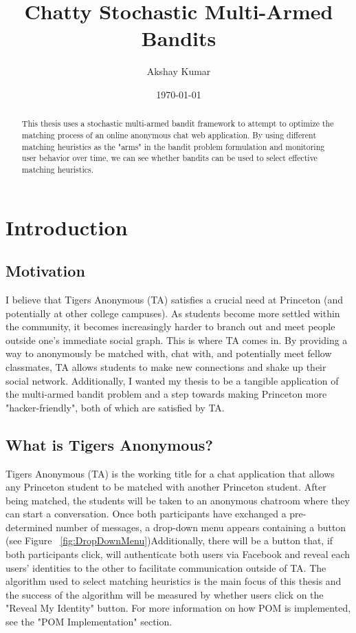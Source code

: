 \documentclass{article}
\begin{document}
\title{Chatty Stochastic Multi-Armed Bandits}
\author{Akshay Kumar}
\date{\today}
\maketitle

\begin{abstract}

This thesis uses a stochastic multi-armed bandit framework to attempt to optimize the matching process of an online anonymous chat web application. By using different matching heuristics as the "arms" in the bandit problem formulation and monitoring user behavior over time, we can see whether bandits can be used to select effective matching heuristics.

\end{abstract}

\tableofcontents
\newpage

\section{Introduction}

\subsection{Motivation}

I believe that Tigers Anonymous (TA) satisfies a crucial need at Princeton (and potentially at other college campuses). As students become more settled within the community, it becomes increasingly harder to branch out and meet people outside one's immediate social graph. This is where TA comes in. By providing a way to anonymously be matched with, chat with, and potentially meet fellow classmates, TA allows students to make new connections and shake up their social network. Additionally, I wanted my thesis to be a tangible application of the multi-armed bandit problem and a step towards making Princeton more "hacker-friendly", both of which are satisfied by TA.

\subsection{What is Tigers Anonymous?}

Tigers Anonymous (TA) is the working title for a chat application that allows any Princeton student to be matched with another Princeton student. After being matched, the students will be taken to an anonymous chatroom where they can start a conversation. Once both participants have exchanged a pre-determined number of messages, a drop-down menu appears containing a button (see Figure ~\ref{fig:DropDownMenu})Additionally, there will be a button that, if both participants click, will authenticate both users via Facebook and reveal each users' identities to the other to facilitate communication outside of TA. The algorithm used to select matching heuristics is the main focus of this thesis and the success of the algorithm will be measured by whether users click on the "Reveal My Identity" button. For more information on how POM is implemented, see the "POM Implementation" section.
\end{document}

